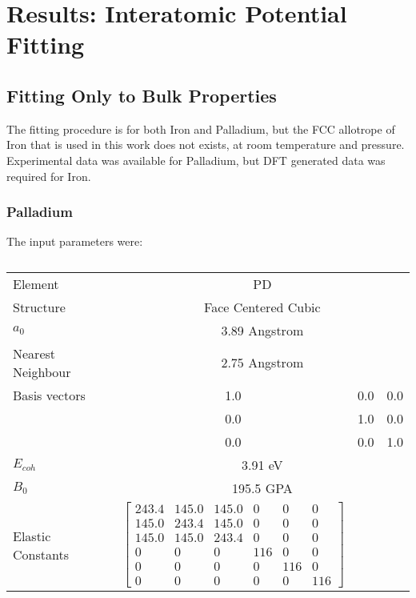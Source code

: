 \chapter{Results: Interatomic Potential Fitting}

\begin{changemargin}{1.0cm}{1.0cm}
\end{changemargin}




\section{Fitting Only to Bulk Properties}

The fitting procedure is for both Iron and Palladium, but the FCC allotrope of Iron that is used in this work does not exists, at room temperature and pressure.  Experimental data was available for Palladium, but DFT generated data was required for Iron. 

\subsection{Palladium}

The input parameters were:

\begin{table}[ht]
\begin{tabular}{lccc}
\hline
Element & \multicolumn{3}{c}{PD}\\
Structure             & \multicolumn{3}{c}{Face Centered Cubic}\\
$a_0$                 & \multicolumn{3}{c}{3.89 Angstrom \cite{webelementspd}}\\
Nearest Neighbour     & \multicolumn{3}{c}{2.75 Angstrom \cite{webelementspd}}\\
Basis vectors         & 1.0 & 0.0 & 0.0 \\
                      & 0.0 & 1.0 & 0.0 \\
                      & 0.0 & 0.0 & 1.0         \\
$E_{coh}$             & \multicolumn{3}{c}{3.91 eV \cite{semiempiricalpots}}   \\
$B_0$                 & \multicolumn{3}{c}{195.5 GPA \cite{semiempiricalpots}}   \\
Elastic Constants     & $\begin{bmatrix} 243.4 & 145.0 & 145.0 & 0 & 0 & 0 \\ 145.0 & 243.4 & 145.0 & 0 & 0 & 0 \\ 145.0 & 145.0 & 243.4 & 0 & 0 & 0 \\ 0 & 0 & 0 & 116 & 0 & 0 \\ 0 & 0 & 0 & 0 & 116 & 0 \\ 0 & 0 & 0 & 0 & 0 & 116 \end{bmatrix}$ \\
\hline
\end{tabular}
\label{tab:multicol}
\caption{}
\end{table}


